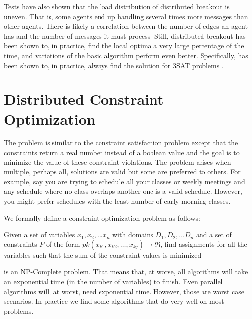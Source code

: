 Tests have also shown that the load distribution of distributed
breakout is uneven.  That is, some agents end up handling several
times more messages than other agents. There is likely a correlation
between the number of edges an agent has and the number of messages it
must process. Still, distributed breakout has been shown to, in
practice, find the local optima a very large percentage of the time,
and variations of the basic algorithm perform even better.
Specifically,  has been shown to, in practice,
always find the solution for 3SAT problems \cite{hirayama05a}.


\section{Distributed Constraint Optimization}
\label{sec:dcop}


The  problem is similar to the
constraint satisfaction problem except that the constraints return a
real number instead of a boolean value and the goal is to minimize the
value of these constraint violations. The problem arises when
multiple, perhaps all, solutions are valid but some are preferred to
others. For example, say you are trying to schedule all your classes
or weekly meetings and any schedule where no class overlaps another
one is a valid schedule. However, you might prefer schedules with the
least number of early morning classes.

We formally define a constraint optimization problem as follows:


\begin{definition}
  Given a set of variables $x_1, x_2,\ldots x_n$ with domains $D_1,
  D_2,\ldots D_n$ and a set of constraints $P$ of the form $pk(x_{k1},
  x_{k2},\ldots, x_{kj}) \rightarrow \Re$, find assignments for all
  the variables such that the sum of the constraint values is
  minimized.
\end{definition}

 is an NP-Complete problem. That means that, at worse, all
algorithms will take an exponential time (in the number of variables)
to finish. Even parallel algorithms will, at worst, need exponential
time. However, those are worst case scenarios. In practice we find
some algorithms that do very well on most problems.


